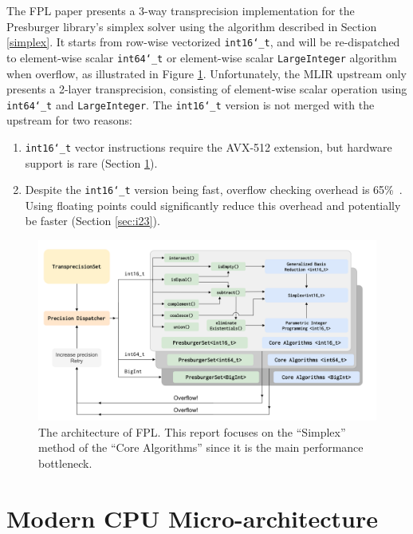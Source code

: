 \documentclass[logo,bsc,singlespacing,parskip]{infthesis}
\newcommand{\dtshort}{\texttt{int16\char`_t}}
\newcommand{\dtlong}{\texttt{int64\char`_t}}
\begin{document}
The FPL paper presents a 3-way transprecision implementation for the Presburger library's simplex solver using the algorithm described in Section \ref{simplex}. It starts from row-wise vectorized \dtshort{}, and will be re-dispatched to element-wise scalar \dtlong{} or element-wise scalar \texttt{LargeInteger} algorithm when overflow, as illustrated in Figure \ref{fig:fpl_arch}. Unfortunately, the MLIR upstream only presents a 2-layer transprecision, consisting of element-wise scalar operation using \dtlong{} and \texttt{LargeInteger}. The \dtshort{} version is not merged with the upstream for two reasons: 
\begin{enumerate} 
    \item \dtshort{} vector instructions require the AVX-512 extension, but hardware support is rare (Section \ref{sec:avx512}). 
    \item Despite the \dtshort{} version being fast, overflow checking overhead is 65\%~\cite{FPL2}. Using floating points could significantly reduce this overhead and potentially be faster (Section \ref{sec:i23}).  
\end{enumerate}


\begin{figure}
    \begin{center}
    \includegraphics[width=\linewidth]{image/transprecision.png}
    \caption{The architecture of FPL. This report focuses on the ``Simplex'' method of the ``Core Algorithms'' since it is the main performance bottleneck.~\cite{FPL2}}
    \label{fig:fpl_arch}
    \end{center}
\end{figure}

\section{Modern CPU Micro-architecture}
\label{sec:avx512}
\end{document}
